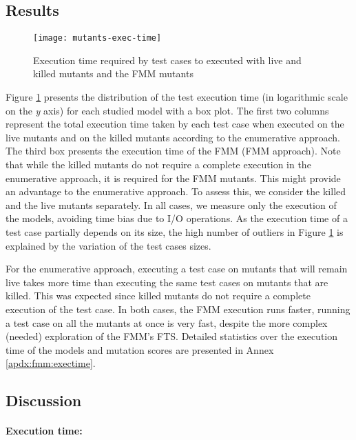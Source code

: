 \subsection{Results}

\begin{figure}
	\centering
	\texttt{[image: mutants-exec-time]}
	\caption{Execution time required by test cases to executed with live and killed mutants and the FMM mutants}
	\label{fig:assessment:mutantsexectime}
\end{figure}

Figure \ref{fig:assessment:mutantsexectime} presents the distribution of the test execution time (in logarithmic scale on the \textit{y} axis) for each studied model with a box plot. The first two columns represent the total execution time taken by each test case when executed on the live mutants and on the killed mutants according to the enumerative approach. The third box presents the execution time of the FMM (FMM approach). Note that while the killed mutants do not require a complete execution in the enumerative approach, it is required for the FMM mutants. This might provide an advantage to the enumerative approach. To assess this, we consider the killed and the live mutants separately. In all cases, we measure only the execution of the models, avoiding time bias due to I/O operations.
As the execution time of a test case partially depends on its size, the high number of outliers in Figure \ref{fig:assessment:mutantsexectime} is explained by the variation of the test cases sizes.

For the enumerative approach, executing a test case on mutants that will remain live takes more time than executing the same test cases on mutants that are killed. This was expected since killed mutants do not require a complete execution of the test case.
In both cases, the FMM execution runs faster, \ie running a test case on all the mutants at once is very fast, despite the more complex (needed) exploration of the FMM's FTS. Detailed statistics over the execution time of the models and mutation scores are presented in Annex \ref{apdx:fmm:exectime}. 

\subsection{Discussion}

\paragraph{Execution time:}

